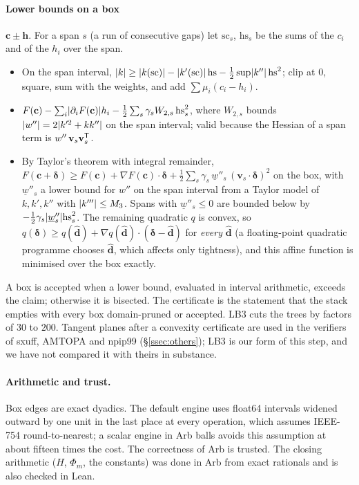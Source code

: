 \paragraph{Lower bounds on a box} $\mathbf c\pm\mathbf h$. For a span $s$ (a run of consecutive gaps) let $\mathrm{sc}_s$, $\mathrm{hs}_s$ be the
sums of the $c_i$ and of the $h_i$ over the span.
\begin{itemize}
\item[(LB1)] On the span interval, $\lvert k\rvert\ge\lvert k(\mathrm{sc})\rvert-\lvert k'(\mathrm{sc})\rvert\,\mathrm{hs}-\frac12\sup\lvert k''\rvert\,\mathrm{hs}^2$; clip at $0$,
square, sum with the weights, and add $\sum\mu_i(c_i-h_i)$.
\item[(LB2)] $F(\mathbf c)-\sum_i\lvert \partial_iF(\mathbf c)\rvert h_i-\frac12\sum_s\gamma_sW_{2,s}\,\mathrm{hs}_s^2$, where $W_{2,s}$ bounds
$\lvert w''\rvert=2\lvert k'^2+kk''\rvert$ on the span interval; valid because the Hessian of a span term is $w''\,\mathbf v_s\mathbf v_s^{\mathsf T}$.
\item[(LB3)] By Taylor's theorem with integral remainder,
$F(\mathbf c+\boldsymbol\delta)\ge F(\mathbf c)+\nabla F(\mathbf c)\cdot\boldsymbol\delta+\frac12\sum_s\gamma_s\,\underline w''_s\,(\mathbf v_s\cdot\boldsymbol\delta)^2$
on the box, with $\underline w''_s$ a lower bound for $w''$ on the span interval from a Taylor model of $k,k',k''$ with $\lvert k'''\rvert\le M_3$. Spans with
$\underline w''_s\le0$ are bounded below by $-\frac12\gamma_s\lvert \underline w''_s\rvert\mathrm{hs}_s^2$. The remaining quadratic $q$ is convex, so
$q(\boldsymbol\delta)\ge q(\hat{\mathbf d})+\nabla q(\hat{\mathbf d})\cdot(\boldsymbol\delta-\hat{\mathbf d})$ for \emph{every} $\hat{\mathbf d}$ (a
floating-point quadratic programme chooses $\hat{\mathbf d}$, which affects only tightness), and this affine function is minimised over the box exactly.
\end{itemize}
A box is accepted when a lower bound, evaluated in interval arithmetic, exceeds the claim; otherwise it is bisected. The certificate is the
statement that the stack empties with every box domain-pruned or accepted. LB3 cuts the trees by factors of $30$ to $200$. Tangent planes
after a convexity certificate are used in the verifiers of \mbox{sxuff}, \mbox{AMTOPA} and \mbox{npip99} (\S\ref{ssec:others}); LB3 is our form of this step, and we
have not compared it with theirs in substance.

\paragraph{Arithmetic and trust.} Box edges are exact dyadics. The default engine uses float64 intervals widened outward by one unit in the last
place at every operation, which assumes IEEE-754 round-to-nearest; a scalar engine in Arb balls avoids this assumption at about fifteen times the
cost. The correctness of Arb is trusted. The closing arithmetic ($H$, $\Phi_m$, the constants) was done in Arb from exact rationals and is also
checked in Lean.

